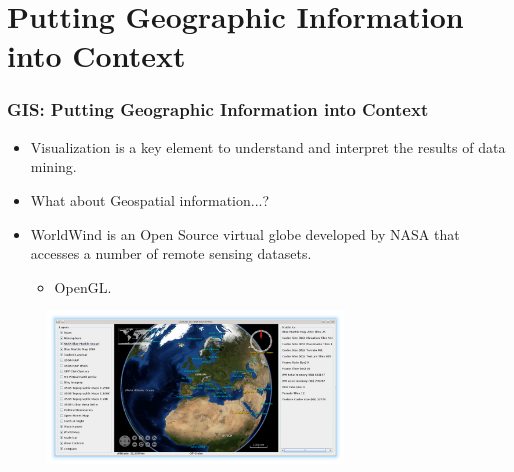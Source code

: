\documentclass[hyperref={pdfpagelabels=true}]{beamer}
\begin{document}
\section{Putting Geographic Information into Context} 
\begin{frame}
\frametitle{GIS: Putting Geographic Information into Context}
    \begin{itemize}
      \item<1->Visualization is a key element to understand and interpret the results of data mining.%
      \item<2->What about Geospatial information...?
      \item<3->WorldWind is an Open Source virtual globe developed by NASA that accesses a number of remote sensing datasets.%
      \begin{itemize}
	  \item<3->OpenGL.%
       \end{itemize}
      \end{itemize}
      \begin{figure}  
	\includegraphics[width=0.7\textwidth]{bluemarble.png}
       \end{figure}  
\end{frame}
\end{document}
